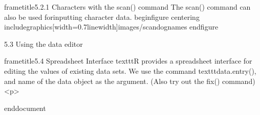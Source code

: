  		frametitle{5.2.1 Characters with the scan() command}
 		The scan() command can also be used forinputting character data.
 		begin{figure}
 			centering
 			includegraphics[width=0.7linewidth]{images/scandognames}
 		end{figure}
 		
 	
 	
 		5.3 Using the data editor
 		
 	
 	
 		frametitle{5.4 Spreadsheet Interface}
 		texttt{R} provides a spreadsheet interface for editing the values of existing data sets. We use the
 		command texttt{data.entry()}, and name of the data object as the argument. (Also try out the
 		fix() command)
<p>
 		
 	
 	
 	
 	
 	
 	
 end{document}
